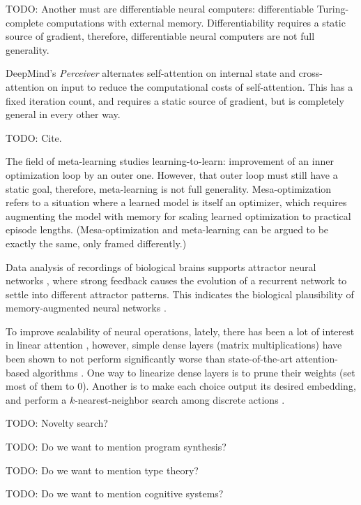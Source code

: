 \documentclass{article}
\begin{document}
    TODO: Another must are differentiable neural computers: differentiable Turing-complete computations with external memory. Differentiability requires a static source of gradient, therefore, differentiable neural computers are not full generality.

DeepMind's \textit{Perceiver} \cite{DBLP:journals/corr/abs-2103-03206} alternates self-attention on internal state and cross-attention on input to reduce the computational costs of self-attention. This has a fixed iteration count, and requires a static source of gradient, but is completely general in every other way.

    TODO: Cite.

The field of meta-learning studies learning-to-learn: improvement of an inner optimization loop by an outer one. However, that outer loop must still have a static goal, therefore, meta-learning is not full generality. Mesa-optimization \cite{hubinger2019risks} refers to a situation where a learned model is itself an optimizer, which requires augmenting the model with memory for scaling learned optimization to practical episode lengths. (Mesa-optimization and meta-learning can be argued to be exactly the same, only framed differently.)

Data analysis of recordings of biological brains supports attractor neural networks \cite{AMIT1990111}, where strong feedback causes the evolution of a recurrent network to settle into different attractor patterns. This indicates the biological plausibility of memory-augmented neural networks \cite{santoro2016oneshot}.

To improve scalability of neural operations, lately, there has been a lot of interest in linear attention \cite{schlag2021linear}, however, simple dense layers (matrix multiplications) have been shown to not perform significantly worse than state-of-the-art attention-based algorithms \cite{tolstikhin2021mlpmixer}. One way to linearize dense layers is to prune their weights \cite{zhou2021effective} (set most of them to $0$). Another is to make each choice output its desired embedding, and perform a $k$-nearest-neighbor search among discrete actions \cite{DBLP:journals/corr/Dulac-ArnoldESC15}.

    TODO: Novelty search?

    TODO: Do we want to mention program synthesis?

    TODO: Do we want to mention type theory?

    TODO: Do we want to mention cognitive systems?
\end{document}
